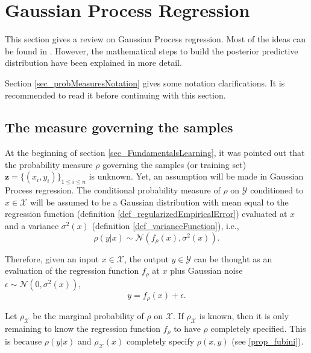 \section{Gaussian Process Regression} \label{sec_GP}

This section gives a review on Gaussian Process regression. Most of the ideas can be found in \textcite{rasmussen2006}. However, the mathematical steps to build the posterior predictive distribution have been explained in more detail.

Section \ref{sec_probMeasuresNotation} gives some notation clarifications. It is recommended to read it before continuing with this section.


\subsection{The measure governing the samples}

At the beginning of section \ref{sec_FundamentalsLearning}, it was pointed out that the probability measure $\rho$ governing the samples (or training set) $\pmb{z} = \{(x_i,y_i)\}_{1 \leq i \leq n}$ is unknown. Yet, an assumption will be made in Gaussian Process regression. The conditional probability measure of $\rho$ on $\mathcal{Y}$ conditioned to $x \in \mathcal{X}$ will be assumed to be a Gaussian distribution with mean equal to the regression function (definition \ref{def_regularizedEmpiricalError}) evaluated at $x$ and a variance $\sigma^2(x)$ (definition \ref{def_varianceFunction}), i.e.,
\begin{equation} \label{eq_condRhoGaussian}
  \rho(y | x) \sim \mathcal{N}(f_{\rho}(x), \sigma^2(x)).
\end{equation}

Therefore, given an input $x \in \mathcal{X}$, the output $y \in \mathcal{Y}$ can be thought as an evaluation of the regression function $f_{\rho}$ at $x$ plus Gaussian noise $\epsilon \sim \mathcal{N}(0, \sigma^2(x))$,
\begin{equation*}
  y = f_{\rho}(x) + \epsilon.
\end{equation*}

\begin{remark} \label{remark_GPandRho}
  Let $\rho_{\mathcal{X}}$ be the marginal probability of $\rho$ on $\mathcal{X}$. If $\rho_{\mathcal{X}}$ is known, then it is only remaining to know the regression function $f_{\rho}$ to have $\rho$ completely specified. This is because $\rho(y|x)$ and $\rho_{\mathcal{X}}(x)$ completely specify $\rho(x,y)$ (see \ref{prop_fubini}). 
\end{remark}

